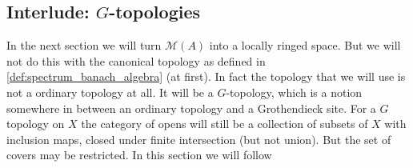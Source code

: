 \subsection{Interlude: $G$-topologies} \label{sec:interlude_g_topologies}

In the next section we will turn $\mathcal{M} (A)$ into a locally ringed space. 
But we will not do this with the canonical topology as defined in \cref{def:spectrum_banach_algebra} (at first). 
In fact the topology that we will use is not a ordinary topology at all. 
It will be a $G$-topology, which is a notion somewhere in between an ordinary topology and a Grothendieck site. 
For a $G$ topology on $X$
the category of opens will still be a collection of subsets of $X$ with inclusion maps, closed under finite intersection (but not union). But the set of covers may be restricted. 
In this section we will follow \cite[][sec. 9.1.]{siegfriedboschNonArchimedeanAnalysisSystematic1984}

